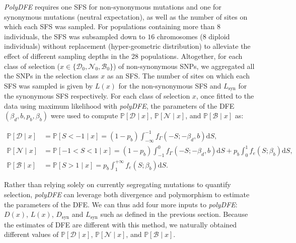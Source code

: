 \documentclass[10pt,letterpaper]{article}
\newcommand{\der}{\text{d}}
\newcommand{\proba}{\mathbb{P}}
\newcommand{\SphyDel}{\mathcal{D}_0}
\newcommand{\SphyNeu}{\mathcal{N}_0}
\newcommand{\SphyBen}{\mathcal{B}_0}
\newcommand{\Sphyclass}{x}
\newcommand{\given}{\mid}
\newcommand{\Spop}{S}
\newcommand{\SpopDel}{\mathcal{D}}
\newcommand{\SpopNeu}{\mathcal{N}}
\newcommand{\SpopBen}{\mathcal{B}}
\newcommand{\AdvMean}{\beta_b}
\newcommand{\DelMean}{\beta_d}
\begin{document}
\textit{PolyDFE} requires one SFS for non-synonymous mutations and one for synonymous mutations (neutral expectation), as well as the number of sites on which each SFS was sampled.
For populations containing more than $8$ individuals, the SFS was subsampled down to $16$ chromosomes ($8$ diploid individuals) without replacement (hyper-geometric distribution) to alleviate the effect of different sampling depths in the 28 populations.
Altogether, for each class of selection ($\Sphyclass \in \{\SphyDel, \SphyNeu, \SphyBen \}$) of non-synonymous SNPs, we aggregated all the SNPs in the selection class $\Sphyclass$ as an SFS.
The number of sites on which each SFS was sampled is given by $L(\Sphyclass)$ for the non-synonymous SFS and $L_{\text{syn}}$ for the synonymous SFS respectively.
For each class of selection $\Sphyclass$, once fitted to the data using maximum likelihood with \textit{polyDFE}, the parameters of the DFE $\left( \DelMean , b, p_b, \AdvMean \right)$ were used to compute $\proba [ \SpopDel \given  \Sphyclass] $, $\proba [ \SpopNeu \given \Sphyclass]$, and $\proba [ \SpopBen \given \Sphyclass]$ as:

\begin{align}
\proba [ \SpopDel \given  \Sphyclass] &= \proba [ \Spop < -1 \given \Sphyclass ] = \left( 1 - p_b \right) \int_{-\infty}^{-1} f_{\Gamma}(-\Spop; -\DelMean, b) \der \Spop, \label{eq:polyProbaDel} \\
\proba [ \SpopNeu \given \Sphyclass] &= \proba [ -1 < \Spop < 1 \given \Sphyclass ] = \left( 1 - p_b \right) \int_{-1}^{0} f_{\Gamma}(-\Spop; -\DelMean, b) \der \Spop + p_b \int_{0}^{1} f_{e}(\Spop; \AdvMean) \der \Spop, \\
\proba [ \SpopBen \given \Sphyclass] &= \proba [ \Spop > 1 \given \Sphyclass] = p_b \int_{1}^{+\infty} f_{e}(\Spop; \AdvMean) \der \Spop. \label{eq:polyProbaAdv}
\end{align}

Rather than relying solely on currently segregating mutations to quantify selection, \textit{polyDFE} can leverage both divergence and polymorphism to estimate the parameters of the DFE.
We can thus add four more inputs to \textit{polyDFE}: $D \left( \Sphyclass \right) $, $L \left( \Sphyclass \right)$, $D_{\text{syn}}$ and $L_{\text{syn}}$ such as defined in the previous section.
Because the estimates of DFE are different with this method, we naturally obtained different values of $\proba [ \SpopDel \given  \Sphyclass] $, $\proba [ \SpopNeu \given \Sphyclass]$, and $\proba [ \SpopBen \given \Sphyclass]$.
\end{document}
